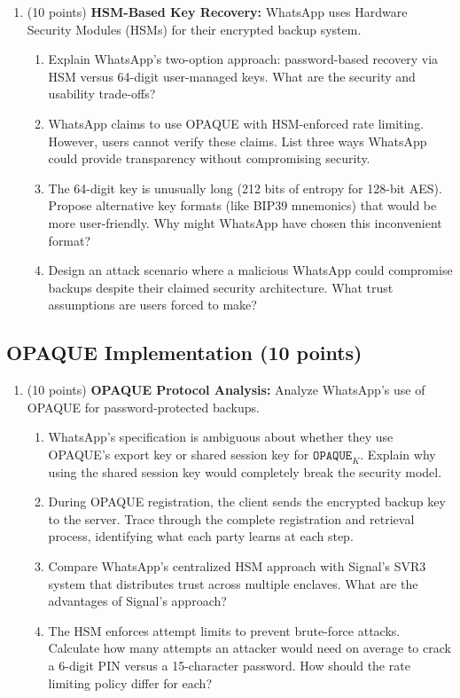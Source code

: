 \documentclass[10pt,a4paper,american]{exam}
\begin{document}
\begin{enumerate}
	\item (10 points) \textbf{HSM-Based Key Recovery:}
	      WhatsApp uses Hardware Security Modules (HSMs) for their encrypted backup system.
	      \begin{enumerate}
		      \item Explain WhatsApp's two-option approach: password-based recovery via HSM versus 64-digit user-managed keys. What are the security and usability trade-offs?
		      \item WhatsApp claims to use OPAQUE with HSM-enforced rate limiting. However, users cannot verify these claims. List three ways WhatsApp could provide transparency without compromising security.
		      \item The 64-digit key is unusually long (212 bits of entropy for 128-bit AES). Propose alternative key formats (like BIP39 mnemonics) that would be more user-friendly. Why might WhatsApp have chosen this inconvenient format?
		      \item Design an attack scenario where a malicious WhatsApp could compromise backups despite their claimed security architecture. What trust assumptions are users forced to make?
	      \end{enumerate}
\end{enumerate}

\subsection{OPAQUE Implementation (10 points)}

\begin{enumerate}
	\item (10 points) \textbf{OPAQUE Protocol Analysis:}
	      Analyze WhatsApp's use of OPAQUE for password-protected backups.
	      \begin{enumerate}
		      \item WhatsApp's specification is ambiguous about whether they use OPAQUE's export key or shared session key for $\mathtt{OPAQUE}_K$. Explain why using the shared session key would completely break the security model.
		      \item During OPAQUE registration, the client sends the encrypted backup key to the server. Trace through the complete registration and retrieval process, identifying what each party learns at each step.
		      \item Compare WhatsApp's centralized HSM approach with Signal's SVR3 system that distributes trust across multiple enclaves. What are the advantages of Signal's approach?
		      \item The HSM enforces attempt limits to prevent brute-force attacks. Calculate how many attempts an attacker would need on average to crack a 6-digit PIN versus a 15-character password. How should the rate limiting policy differ for each?
	      \end{enumerate}
\end{enumerate}
\end{document}

